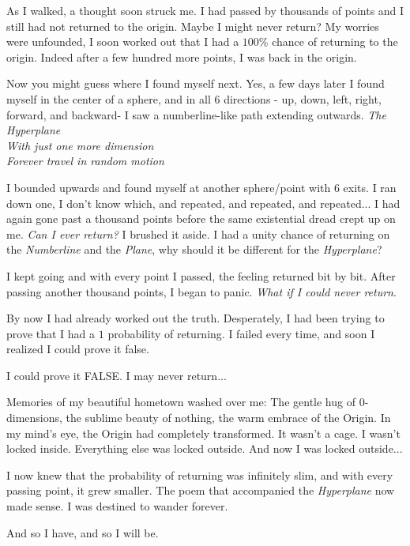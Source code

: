 \documentclass{article}
\begin{document}
As I walked, a thought soon struck me. I had passed by thousands of points and I still had not returned to the origin. Maybe I might never return? My worries were unfounded, I soon worked out that I had a $100$\% chance of returning to the origin. Indeed after a few hundred more points, I was back in the origin. 

Now you might guess where I found myself next. Yes, a few days later I found myself in the center of a sphere, and in all $6$ directions - up, down, left, right, forward, and backward- I saw a numberline-like path extending outwards. 
\emph{The Hyperplane\\
With just one more dimension\\
Forever travel in random motion
}

I bounded upwards and found myself at another sphere/point with 6 exits. I ran down one, I don't know which, and repeated, and repeated, and repeated... I had again gone past a thousand points before the same existential dread crept up on me. \emph{Can I ever return?} I brushed it aside. I had a unity chance of returning on the \emph{Numberline} and the \emph{Plane}, why should it be different for the \emph{Hyperplane}? 

I kept going and with every point I passed, the feeling returned bit by bit. After passing another thousand points, I began to panic. \emph{What if I could never return}. 

By now I had already worked out the truth. Desperately, I had been trying to prove that I had a $1$ probability of returning. I failed every time, and soon I realized I could prove it false. 

I could prove it FALSE. I may never return... 

Memories of my beautiful hometown washed over me: The gentle hug of $0$-dimensions, the sublime beauty of nothing, the warm embrace of the Origin. In my mind's eye, the Origin had completely transformed. It wasn't a cage. I wasn't locked inside. Everything else was locked outside. And now I was locked outside...

I now knew that the probability of returning was infinitely slim, and with every passing point, it grew smaller. The poem that accompanied the \emph{Hyperplane} now made sense. I was destined to wander forever.

And so I have, and so I will be. 
\end{document}
